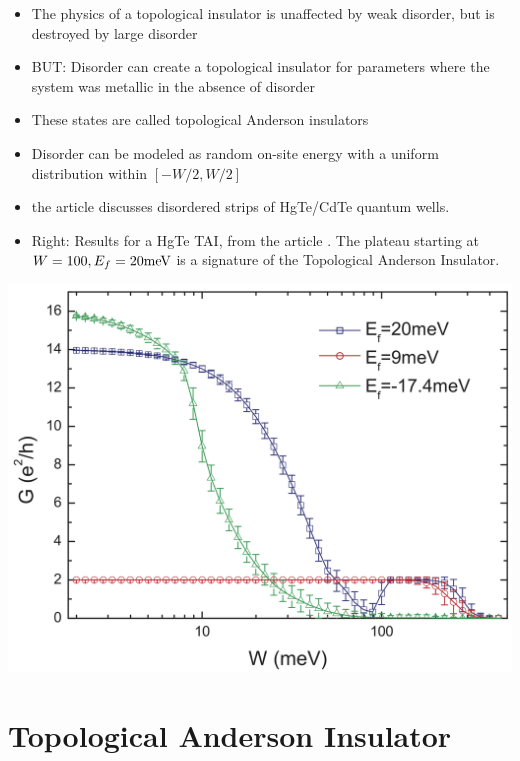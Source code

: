 \documentclass[12pt]{article}
\numberwithin{equation}{section}
\begin{document}
\begin{minipage}[c]{0.45\textwidth}
  \begin{itemize}
    \item The physics of a topological insulator is unaffected by weak
    disorder, but is destroyed by large disorder
    \item BUT: Disorder can create a topological insulator for parameters where the system was metallic in 
    the absence of disorder
    \item These states are called topological Anderson insulators
    \item Disorder can be modeled as random on-site energy with a uniform distribution within $[-W/2, W/2]$
    \item the article discusses disordered strips of HgTe/CdTe quantum wells.
    \item Right: Results for a HgTe TAI, from the article \cite{andersoninsulator}. The plateau starting at
    $W=100, E_f=20\textnormal{meV}$ is a signature of the Topological Anderson Insulator.
  \end{itemize}
\end{minipage}
\hfill
\begin{minipage}[c]{0.5\textwidth}
    \includegraphics[width=\textwidth]{./media/tai_results_from_article.png}
\end{minipage}

\newpage
\section*{Topological Anderson Insulator}
\end{document}
